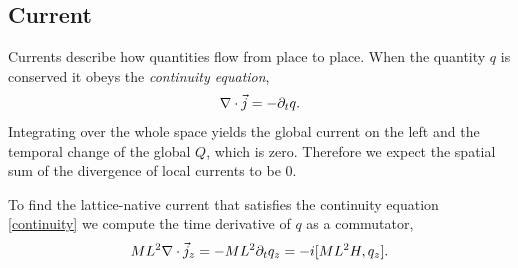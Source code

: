 \subsection{Current}\label{sec:current}

Currents describe how quantities flow from place to place.
When the quantity $q$ is conserved it obeys the \emph{continuity equation},
\begin{align}
	\nabla \cdot \vec{j} = - \partial_t q.
	\label{eq:continuity}
\end{align}
Integrating over the whole space yields the global current on the left and the temporal change of the global $Q$, which is zero.
Therefore we expect the spatial sum of the divergence of local currents to be 0.

To find the lattice-native current that satisfies the continuity equation \eqref{continuity} we compute the time derivative of $q$ as a commutator,
\begin{align}
	ML^2\nabla\cdot\vec{j}_z = -ML^2 \partial_t q_z = -i[ML^2H, q_z].
\end{align}

